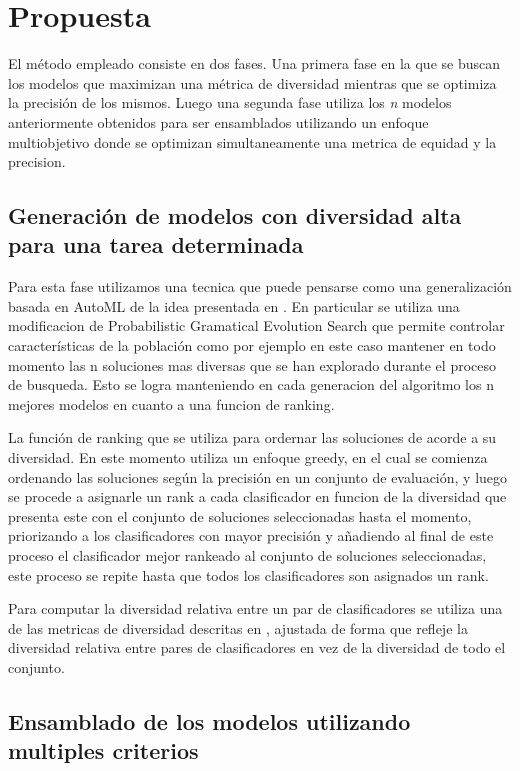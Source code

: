 \chapter{Propuesta}\label{chapter:proposal}

El método empleado consiste en dos fases. Una primera fase en la que se buscan los modelos que
maximizan una métrica de diversidad mientras que se optimiza la precisión de los mismos. Luego una
segunda fase utiliza los \emph{n} modelos anteriormente obtenidos para ser ensamblados utilizando un
enfoque multiobjetivo donde se optimizan simultaneamente una metrica de equidad y la precision.

\section{Generación de modelos con diversidad alta para una tarea determinada}

Para esta fase utilizamos una tecnica que puede pensarse como una generalización basada en AutoML de
la idea presentada en \cite{SnapshotEnsembles}. En particular se utiliza una modificacion de
Probabilistic Gramatical Evolution Search que permite controlar características de la población como
por ejemplo en este caso mantener en todo momento las n soluciones mas diversas que se han explorado
durante el proceso de busqueda. Esto se logra manteniendo en cada generacion del algoritmo los n mejores
modelos en cuanto a una funcion de ranking.

La función de ranking que se utiliza para ordernar las soluciones de acorde a su diversidad. En este
momento utiliza un enfoque greedy, en el cual se comienza ordenando las soluciones según la precisión
en un conjunto de evaluación, y luego se procede a asignarle un rank a cada clasificador en funcion
de la diversidad que presenta este con el conjunto de soluciones seleccionadas hasta el momento,
priorizando a los clasificadores con mayor precisión y añadiendo al final de este proceso el
clasificador mejor rankeado al conjunto de soluciones seleccionadas, este proceso se repite hasta
que todos los clasificadores son asignados un rank.

Para computar la diversidad relativa entre un par de clasificadores se utiliza una de las metricas
de diversidad descritas en \cite{DiversityMeassures}, ajustada de forma que refleje la diversidad
relativa entre pares de clasificadores en vez de la diversidad de todo el conjunto.

\section{Ensamblado de los modelos utilizando multiples criterios}

